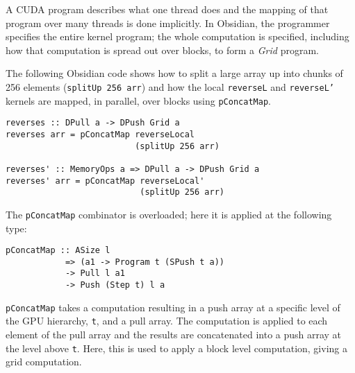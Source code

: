 

A CUDA program describes what one thread does and the mapping of that 
program over many threads is done implicitly.
In Obsidian, the programmer specifies the entire kernel
program;  the whole computation is specified, including how that computation 
is spread out over blocks, to form a {\em Grid} program. 

The following Obsidian code shows how to split a large array up into 
chunks of 256 elements ({\tt splitUp 256 arr}) and how the local {\tt reverseL} 
and {\tt reverseL'} kernels are  mapped, in parallel, over blocks using {\tt pConcatMap}. 

\begin{small} 
\begin{verbatim} 
reverses :: DPull a -> DPush Grid a
reverses arr = pConcatMap reverseLocal
                          (splitUp 256 arr) 

reverses' :: MemoryOps a => DPull a -> DPush Grid a
reverses' arr = pConcatMap reverseLocal'
                           (splitUp 256 arr) 
\end{verbatim} 
\end{small} 

\pagebreak
\noindent
The {\tt pConcatMap} combinator is overloaded; here it is applied 
at the following type: 
\begin{small}
\begin{Verbatim}[samepage=true] 
pConcatMap :: ASize l 
            => (a1 -> Program t (SPush t a))
            -> Pull l a1 
            -> Push (Step t) l a
\end{Verbatim}
\end{small}

{\tt pConcatMap} takes a computation resulting in a push array at a specific 
level of the GPU hierarchy, {\tt t}, and a pull array. The computation 
is applied to each element of the pull array and the results are concatenated 
into a push array at the level above {\tt t}. Here, this is used to apply a block 
level computation, giving a grid computation. 


